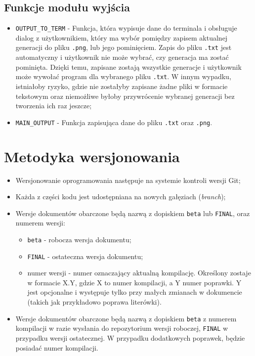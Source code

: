 \documentclass[a4paper,12pt]{article}
\begin{document}
\subsection{Funkcje modułu wyjścia}
\begin{itemize}
\item \texttt{OUTPUT\_TO\_TERM} - Funkcja, która wypisuje dane do terminala i obsługuje dialog z użytkownikiem, który ma wybór pomiędzy zapisem aktualnej generacji do pliku \texttt{.png}, lub jego pominięciem. Zapis do pliku \texttt{.txt} jest automatyczny i użytkownik nie może wybrać, czy generacja ma zostać pominięta. Dzięki temu, zapisane zostają wszystkie generacje i użytkownik może wywołać program dla wybranego pliku \texttt{.txt}. W innym wypadku, istniałoby ryzyko, gdzie nie zostałyby zapisane żadne pliki w formacie tekstowym oraz niemożliwe byłoby przywrócenie wybranej generacji bez tworzenia ich raz jeszcze;
\item \texttt{MAIN\_OUTPUT} - Funkcja zapisująca dane do pliku \texttt{.txt} oraz \texttt{.png}.
\end{itemize}
\section{Metodyka wersjonowania}
\begin{itemize}
\item Wersjonowanie oprogramowania następuje na systemie kontroli wersji Git;
\item Każda z części kodu jest udostępniana na nowych gałęziach (\textit{branch});
\item Wersje dokumentów obarczone będą nazwą z dopiskiem \texttt{beta} lub \texttt{FINAL}, oraz numerem wersji:
	\begin{itemize}
	\item \texttt{beta} - robocza wersja dokumentu;
	\item \texttt{FINAL} - ostateczna wersja dokumentu;
	\item numer wersji - numer oznaczający aktualną kompilację. Określony zostaje w formacie X.Y, gdzie X to numer kompilacji, a Y numer poprawki. Y jest opcjonalne i występuje tylko przy małych zmianach w dokumencie (takich jak przykładowo poprawa literówki).
	\end{itemize}
\item Wersje dokumentów obarczone będą nazwą z dopiskiem \texttt{beta} z numerem kompilacji w razie wysłania do repozytorium wersji roboczej,  \texttt{FINAL} w przypadku wersji ostatecznej. W przypadku dodatkowych poprawek, będzie posiadać numer kompilacji.
\end{itemize}
\end{document}

